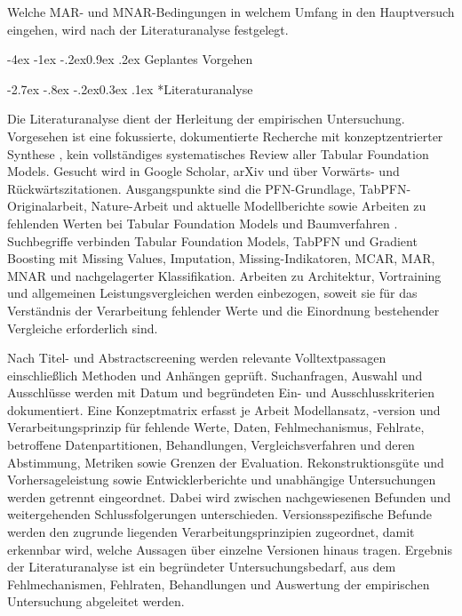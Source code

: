 \documentclass[12pt,a4paper]{article}
\makeatletter
\renewcommand\section{\@startsection{section}{1}{\z@}%
  {-4ex \@plus -1ex \@minus -.2ex}{0.9ex \@plus .2ex}%
  {\normalfont\Large\bfseries}}
\renewcommand\subsection{\@startsection{subsection}{2}{\z@}%
  {-2.7ex \@plus -.8ex \@minus -.2ex}{0.3ex \@plus .1ex}%
  {\normalfont\large\bfseries}}
\makeatother
\begin{document}
Welche MAR- und MNAR-Bedingungen in welchem Umfang in den Hauptversuch
eingehen, wird nach der Literaturanalyse festgelegt.

\section{Geplantes Vorgehen}

\subsection*{Literaturanalyse}

Die Literaturanalyse dient der Herleitung der empirischen Untersuchung.
Vorgesehen ist eine fokussierte, dokumentierte Recherche mit
konzeptzentrierter Synthese \cite{webster_analyzing_2002}, kein
vollständiges systematisches Review aller Tabular Foundation Models.
Gesucht wird in Google Scholar, arXiv und über Vorwärts- und
Rückwärtszitationen. Ausgangspunkte sind die PFN-Grundlage,
TabPFN-Originalarbeit, Nature-Arbeit und aktuelle Modellberichte
\cite{muller_transformers_2024,hollmann_tabpfn_2023,
hollmann_accurate_2025,grinsztajn_tabpfn-25_2026,jager_tabpfn-35_2026}
sowie Arbeiten zu fehlenden Werten bei Tabular Foundation Models und
Baumverfahren \cite{perez_benchmarking_2022,zaimoglu_tabpfn_2026,
luo_time_2025,feitelberg_pipeline_2026}.
Suchbegriffe verbinden Tabular Foundation Models, TabPFN und Gradient
Boosting mit Missing Values, Imputation, Missing-Indikatoren,
MCAR, MAR, MNAR und nachgelagerter Klassifikation. Arbeiten zu
Architektur, Vortraining und allgemeinen Leistungsvergleichen werden
einbezogen, soweit sie für das Verständnis der Verarbeitung fehlender
Werte und die Einordnung bestehender Vergleiche erforderlich sind.

Nach Titel- und Abstractscreening werden relevante Volltextpassagen
einschließlich Methoden und Anhängen geprüft. Suchanfragen, Auswahl und
Ausschlüsse werden mit Datum und begründeten Ein- und Ausschlusskriterien
dokumentiert. Eine Konzeptmatrix erfasst je Arbeit Modellansatz,
-version und Verarbeitungsprinzip für fehlende Werte, Daten,
Fehlmechanismus, Fehlrate, betroffene
Datenpartitionen, Behandlungen, Vergleichsverfahren und deren
Abstimmung, Metriken sowie Grenzen der Evaluation. Rekonstruktionsgüte
und Vorhersageleistung sowie Entwicklerberichte und unabhängige
Untersuchungen werden getrennt eingeordnet. Dabei wird zwischen
nachgewiesenen Befunden und weitergehenden Schlussfolgerungen
unterschieden. Versionsspezifische Befunde werden den zugrunde
liegenden Verarbeitungsprinzipien zugeordnet, damit erkennbar wird,
welche Aussagen über einzelne Versionen hinaus tragen. Ergebnis der
Literaturanalyse ist ein begründeter Untersuchungsbedarf, aus dem
Fehlmechanismen, Fehlraten, Behandlungen und Auswertung der
empirischen Untersuchung abgeleitet werden.
\end{document}
